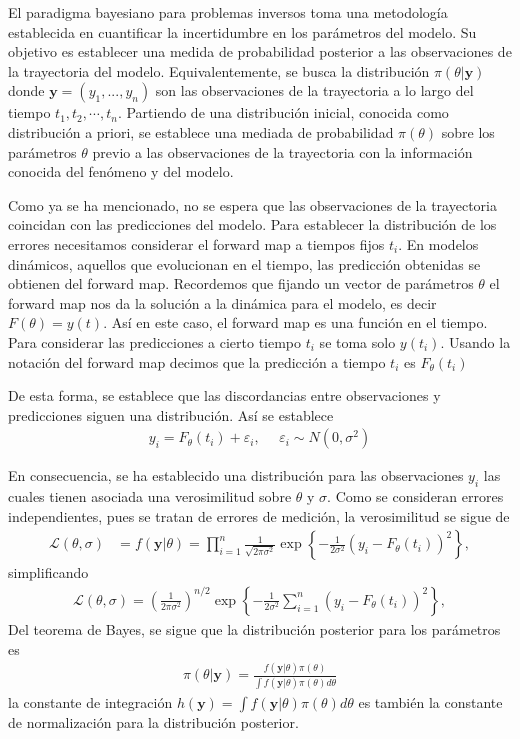 El paradigma bayesiano para problemas inversos toma una metodología establecida en cuantificar la incertidumbre en los parámetros del modelo. Su objetivo es establecer una medida de probabilidad posterior a las observaciones de la trayectoria del modelo. Equivalentemente, se busca la distribución $\pi(\theta|\mathbf{y})$ donde $\mathbf{y} = (y_1,...,y_n)$ son las observaciones de la trayectoria a lo largo del tiempo $t_1, t_2, \cdots, t_n$. Partiendo de una distribución inicial, conocida como distribución a priori, se establece una mediada de probabilidad $\pi(\theta)$ sobre los parámetros $\theta$ previo a las observaciones de la trayectoria con la información conocida del fenómeno y del modelo.

Como ya se ha mencionado, no se espera que las observaciones de la trayectoria coincidan con las predicciones del modelo. Para establecer la distribución de los errores necesitamos considerar el forward map a tiempos fijos $t_i$. En modelos dinámicos, aquellos que evolucionan en el tiempo, las predicción obtenidas se obtienen del forward map. Recordemos que fijando un vector de parámetros $\theta$ el forward map nos da la solución a la dinámica para el modelo, es decir $F(\theta) = y(t)$. Así en este caso, el forward map es una función en el tiempo. Para considerar las predicciones a cierto tiempo $t_i$ se toma solo $y(t_i)$. Usando la notación del forward map decimos que la predicción a tiempo $t_i$ es $F_{\theta}(t_i)$

De esta forma, se establece que las discordancias entre observaciones y predicciones siguen una distribución. Así se establece
\begin{align*}
    y_i = F_{\theta} (t_i) + \varepsilon_i, \:\:\:\:\:\: \varepsilon_i \sim N(0,\sigma^2)
\end{align*}

En consecuencia, se ha establecido una distribución para las observaciones $y_i$ las cuales tienen asociada una verosimilitud sobre $\theta$ y $\sigma$. Como se consideran errores independientes, pues se tratan de errores de medición, la verosimilitud se sigue de
\begin{align*}
    \mathcal{L}(\theta,\sigma) &= f(\mathbf{y}|\theta) = \prod_{i = 1}^{n} \frac{1}{\sqrt{2\pi \sigma^2}} \exp \left \{ -\frac{1}{2\sigma^2}\left(y_i - F_{\theta}(t_i)\right)^2 \right \} , 
\end{align*}
simplificando
\begin{align*}
    \mathcal{L}(\theta,\sigma) = \left(\frac{1}{2\pi \sigma^2}\right) ^{n/2}\exp \left \{  -\frac{1}{2\sigma^2}\sum_{i = 1}^{n} \left(y_i - F_{\theta}(t_i)\right)^2 \right \},
\end{align*}
Del teorema de Bayes, se sigue que la distribución posterior para los parámetros es
\begin{align}
    \pi(\theta| \mathbf{y})  = \frac{f(\mathbf{y}|\theta)\pi(\theta)}{\int f(\mathbf{y}|\theta)\pi(\theta)d \theta}
    \label{2.2.04}
\end{align}
la constante de integración $h(\mathbf{y}) = \int f(\mathbf{y}|\theta)\pi(\theta)d \theta$ es también la constante de normalización para la distribución posterior. 

